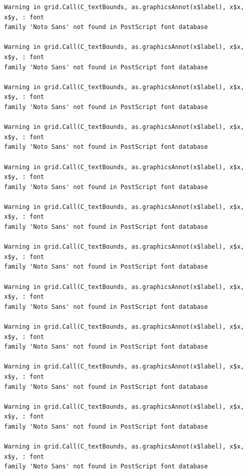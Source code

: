 \documentclass[
  letterpaper,
  DIV=11,
  numbers=noendperiod]{scrartcl}
\begin{document}
\begin{verbatim}
Warning in grid.Call(C_textBounds, as.graphicsAnnot(x$label), x$x, x$y, : font
family 'Noto Sans' not found in PostScript font database

Warning in grid.Call(C_textBounds, as.graphicsAnnot(x$label), x$x, x$y, : font
family 'Noto Sans' not found in PostScript font database

Warning in grid.Call(C_textBounds, as.graphicsAnnot(x$label), x$x, x$y, : font
family 'Noto Sans' not found in PostScript font database

Warning in grid.Call(C_textBounds, as.graphicsAnnot(x$label), x$x, x$y, : font
family 'Noto Sans' not found in PostScript font database

Warning in grid.Call(C_textBounds, as.graphicsAnnot(x$label), x$x, x$y, : font
family 'Noto Sans' not found in PostScript font database

Warning in grid.Call(C_textBounds, as.graphicsAnnot(x$label), x$x, x$y, : font
family 'Noto Sans' not found in PostScript font database

Warning in grid.Call(C_textBounds, as.graphicsAnnot(x$label), x$x, x$y, : font
family 'Noto Sans' not found in PostScript font database

Warning in grid.Call(C_textBounds, as.graphicsAnnot(x$label), x$x, x$y, : font
family 'Noto Sans' not found in PostScript font database

Warning in grid.Call(C_textBounds, as.graphicsAnnot(x$label), x$x, x$y, : font
family 'Noto Sans' not found in PostScript font database

Warning in grid.Call(C_textBounds, as.graphicsAnnot(x$label), x$x, x$y, : font
family 'Noto Sans' not found in PostScript font database

Warning in grid.Call(C_textBounds, as.graphicsAnnot(x$label), x$x, x$y, : font
family 'Noto Sans' not found in PostScript font database

Warning in grid.Call(C_textBounds, as.graphicsAnnot(x$label), x$x, x$y, : font
family 'Noto Sans' not found in PostScript font database
\end{verbatim}
\end{document}

